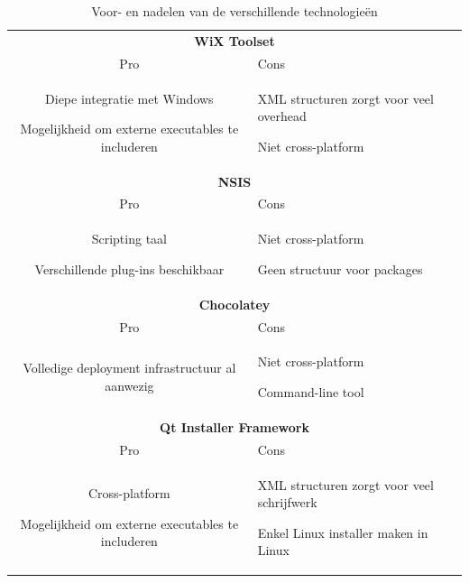 \begin{table}[]
\centering
\begin{tabular*}{\linewidth}{clll}
\hline
\multicolumn{4}{p{\linewidth}}{\centering \textbf{WiX Toolset}}                    \\ 
\multicolumn{2}{p{0.5\linewidth}}{\centering Pro} & \multicolumn{2}{p{0.5\linewidth}}{\centering Cons} \\ \hline
\multicolumn{2}{p{0.5\linewidth}}{Diepe integratie met Windows \par Mogelijkheid om externe executables te includeren}   & \multicolumn{2}{p{0.5\linewidth}}{XML structuren zorgt voor veel overhead \par Niet cross-platform}    \\ \hline
\multicolumn{4}{p{\linewidth}}{\centering \textbf{NSIS}}                           \\ 
\multicolumn{2}{p{0.5\linewidth}}{\centering Pro} & \multicolumn{2}{p{0.5\linewidth}}{\centering Cons} \\ \hline
\multicolumn{2}{p{0.5\linewidth}}{Scripting taal \par Verschillende plug-ins beschikbaar}   & \multicolumn{2}{p{0.5\linewidth}}{ Niet cross-platform \par Geen structuur voor packages}    \\ \hline
\multicolumn{4}{p{\linewidth}}{\centering \textbf{Chocolatey}}                     \\ 
\multicolumn{2}{p{0.5\linewidth}}{\centering Pro} & \multicolumn{2}{p{0.5\linewidth}}{\centering Cons} \\ \hline
\multicolumn{2}{p{0.5\linewidth}}{Volledige deployment infrastructuur al aanwezig}   & \multicolumn{2}{p{0.5\linewidth}}{Niet cross-platform \par Command-line tool}    \\ \hline
\multicolumn{4}{p{\linewidth}}{\centering \textbf{Qt Installer Framework}}         \\ 
\multicolumn{2}{p{0.5\linewidth}}{\centering Pro} & \multicolumn{2}{p{0.5\linewidth}}{\centering Cons} \\ \hline
\multicolumn{2}{p{0.5\linewidth}}{Cross-platform \par Mogelijkheid om externe executables te includeren}   & \multicolumn{2}{p{0.5\linewidth}}{XML structuren zorgt voor veel schrijfwerk \par Enkel Linux installer maken in Linux} \\ \hline
\end{tabular*}
\caption{Voor- en nadelen van de verschillende technologieën}
\label{tab:voorNadelen}
\end{table}

